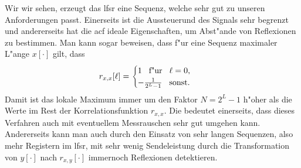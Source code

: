 Wir wir sehen, erzeugt das \gls{lfsr} eine Sequenz, welche sehr gut zu unseren Anforderungen passt. 
Einerseits ist die Aussteuerund des Signals sehr begrenzt und andererseits hat die \gls{acf} ideale Eigenschaften, um Abst"ande von Reflexionen zu bestimmen.
Man kann sogar beweisen, dass f"ur eine Sequenz maximaler L"ange $x[\cdot]$ gilt, dass
\begin{equation}
    r_{x,x}[\ell] = \begin{cases}
        1 {\hspace{3mm} \text{f"ur} \hspace{3mm}} \ell = 0, \\
        -\frac{1}{2^L -1} {\hspace{3mm} \text{sonst.} \hspace{3mm}}
    \end{cases}
\end{equation}
Damit ist das lokale Maximum immer um den Faktor $N = 2^L-1$ h"oher als die Werte im Rest der Korrelationsfunktion $r_{x,x}$. 
Die bedeutet einerseits, dass dieses Verfahren auch mit eventuellem Messrauschen sehr gut umgehen kann.
Andererseits kann man auch durch den Einsatz von sehr langen Sequenzen, also mehr Registern im \gls{lfsr}, mit sehr wenig Sendeleistung durch die Transformation von $y[\cdot]$ nach $r_{x,y}[\cdot]$ immernoch Reflexionen detektieren.
